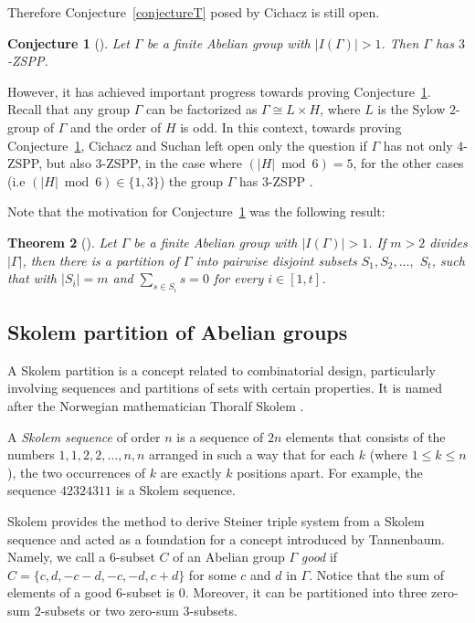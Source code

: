 \documentclass{article}
\newtheorem{thm}{Theorem}[section]
\newtheorem{conj}[thm]{Conjecture}
\begin{document}
Therefore Conjecture~\ref{conjectureT} posed by Cichacz \cite{CicZ} is still open.
\begin{conj}[\cite{CicZ}]\label{conjecture}Let $\Gamma$ be a finite Abelian group with $|I(\Gamma)|>1$. Then $\Gamma$ has $3$-ZSPP. 
\end{conj}

However, it has achieved important progress towards proving Conjecture~\ref{conjecture}. Recall that any group $\Gamma$ can be factorized as $\Gamma\cong L\times H$, where $L$ is the Sylow $2$-group of $\Gamma$ and the order of $H$ is odd. In this context, towards proving Conjecture~\ref{conjecture}, Cichacz and Suchan left open only the question if $\Gamma$ has not only $4$-ZSPP, but also $3$-ZSPP, in the case where $(|H| \bmod{6}) = 5$, for the other cases (i.e $(|H| \bmod{6})\in\{1,3\}$) the group $\Gamma$ has $3$-ZSPP  \cite{CicrSuch2}. 

Note that the motivation for Conjecture~\ref{conjecture} was the following result:
\begin{thm}[\cite{CicZ}]Let $\Gamma$ be a finite Abelian group with $|I(\Gamma)|>1$. If $m>2$ divides $|\Gamma|$, then there is a partition of $\Gamma$ into pairwise disjoint subsets $S_1,S_2,\ldots,$ $S_t$, such that  with $|S_i| = m$ and $\sum_{s\in S_i}s = 0$ for every {$i\in[1,t]$}.
\end{thm}

\subsection{Skolem partition of Abelian groups}
A Skolem partition is a concept related to combinatorial design, particularly involving sequences and partitions of sets with certain properties. It is named after the Norwegian mathematician Thoralf Skolem \cite{Skolem57}. 

A \textit{Skolem sequence} of order $n$ is a sequence of $2n$ elements that consists of the numbers 
$1,1,2,2,\ldots,n,n$ arranged in such a way that for each $k$ (where 
$1\leq k \leq n$), the two occurrences of $k$ are exactly $k$ positions apart. For example,  the sequence $42324311$ is a Skolem sequence.

Skolem provides the method to derive Steiner triple system from a Skolem sequence \cite{Skolem58} and acted as a foundation for a concept introduced by Tannenbaum. Namely, we call a $6$-subset $C$ of an Abelian group $\Gamma$ \textit{good} if $C = \{c, d,-c -d,-c,-d, c + d\}$ for some $c$ and $d$ in $\Gamma$. Notice that the sum of elements of a good $6$-subset is $0$. Moreover, it can be partitioned into three zero-sum $2$-subsets or two zero-sum $3$-subsets.
\end{document}
